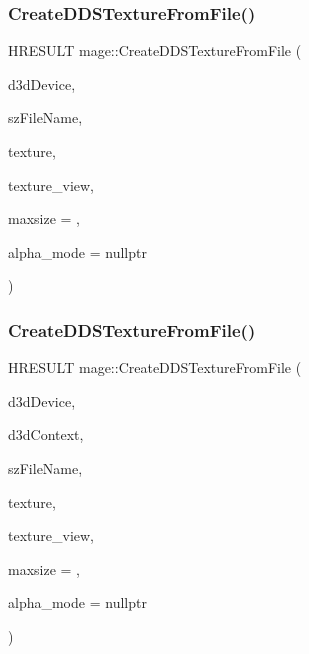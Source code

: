 \subsubsection{\texorpdfstring{Create\+D\+D\+S\+Texture\+From\+File()}{CreateDDSTextureFromFile()}\hspace{0.1cm}{\footnotesize\ttfamily [1/4]}}
{\footnotesize\ttfamily H\+R\+E\+S\+U\+LT mage\+::\+Create\+D\+D\+S\+Texture\+From\+File (\begin{DoxyParamCaption}\item[{\+\_\+\+In\+\_\+ I\+D3\+D11\+Device $\ast$}]{d3d\+Device,  }\item[{\+\_\+\+In\+\_\+z\+\_\+ const wchar\+\_\+t $\ast$}]{sz\+File\+Name,  }\item[{\+\_\+\+Outptr\+\_\+opt\+\_\+ I\+D3\+D11\+Resource $\ast$$\ast$}]{texture,  }\item[{\+\_\+\+Outptr\+\_\+opt\+\_\+ I\+D3\+D11\+Shader\+Resource\+View $\ast$$\ast$}]{texture\+\_\+view,  }\item[{\+\_\+\+In\+\_\+ size\+\_\+t}]{maxsize = {},  }\item[{\+\_\+\+Out\+\_\+opt\+\_\+ \hyperlink{namespacemage_a0c586a2bad862f4858900ca121ca80c2}{D\+D\+S\+\_\+\+A\+L\+P\+H\+A\+\_\+\+M\+O\+DE} $\ast$}]{alpha\+\_\+mode = {\ttfamily nullptr} }\end{DoxyParamCaption})}

\hypertarget{namespacemage_aad2679951c2320a1e68d9923a47a2828}{}\label{namespacemage_aad2679951c2320a1e68d9923a47a2828} 
\subsubsection{\texorpdfstring{Create\+D\+D\+S\+Texture\+From\+File()}{CreateDDSTextureFromFile()}\hspace{0.1cm}{\footnotesize\ttfamily [2/4]}}
{\footnotesize\ttfamily H\+R\+E\+S\+U\+LT mage\+::\+Create\+D\+D\+S\+Texture\+From\+File (\begin{DoxyParamCaption}\item[{\+\_\+\+In\+\_\+ I\+D3\+D11\+Device $\ast$}]{d3d\+Device,  }\item[{\+\_\+\+In\+\_\+opt\+\_\+ I\+D3\+D11\+Device\+Context $\ast$}]{d3d\+Context,  }\item[{\+\_\+\+In\+\_\+z\+\_\+ const wchar\+\_\+t $\ast$}]{sz\+File\+Name,  }\item[{\+\_\+\+Outptr\+\_\+opt\+\_\+ I\+D3\+D11\+Resource $\ast$$\ast$}]{texture,  }\item[{\+\_\+\+Outptr\+\_\+opt\+\_\+ I\+D3\+D11\+Shader\+Resource\+View $\ast$$\ast$}]{texture\+\_\+view,  }\item[{\+\_\+\+In\+\_\+ size\+\_\+t}]{maxsize = {},  }\item[{\+\_\+\+Out\+\_\+opt\+\_\+ \hyperlink{namespacemage_a0c586a2bad862f4858900ca121ca80c2}{D\+D\+S\+\_\+\+A\+L\+P\+H\+A\+\_\+\+M\+O\+DE} $\ast$}]{alpha\+\_\+mode = {\ttfamily nullptr} }\end{DoxyParamCaption})}

